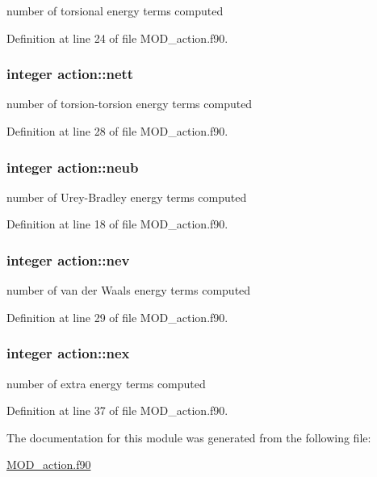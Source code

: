 number of torsional energy terms computed 



Definition at line 24 of file M\-O\-D\-\_\-action.\-f90.

\hypertarget{classaction_a6ea92e5fa1353b0cf4e0220644a28fcf}{
\subsubsection[{nett}]{\setlength{\rightskip}{0pt plus 5cm}integer action\-::nett}}\label{classaction_a6ea92e5fa1353b0cf4e0220644a28fcf}


number of torsion-\/torsion energy terms computed 



Definition at line 28 of file M\-O\-D\-\_\-action.\-f90.

\hypertarget{classaction_a44a0c39774e3630bcb60654dfea00b58}{
\subsubsection[{neub}]{\setlength{\rightskip}{0pt plus 5cm}integer action\-::neub}}\label{classaction_a44a0c39774e3630bcb60654dfea00b58}


number of Urey-\/\-Bradley energy terms computed 



Definition at line 18 of file M\-O\-D\-\_\-action.\-f90.

\hypertarget{classaction_afec6e9aab1f027ea4cb09a04c3503ce4}{
\subsubsection[{nev}]{\setlength{\rightskip}{0pt plus 5cm}integer action\-::nev}}\label{classaction_afec6e9aab1f027ea4cb09a04c3503ce4}


number of van der Waals energy terms computed 



Definition at line 29 of file M\-O\-D\-\_\-action.\-f90.

\hypertarget{classaction_ab44cc1b8e1bff00461e4a7a7595560a3}{
\subsubsection[{nex}]{\setlength{\rightskip}{0pt plus 5cm}integer action\-::nex}}\label{classaction_ab44cc1b8e1bff00461e4a7a7595560a3}


number of extra energy terms computed 



Definition at line 37 of file M\-O\-D\-\_\-action.\-f90.



The documentation for this module was generated from the following file\-:\begin{DoxyCompactItemize}
\item 
\hyperlink{MOD__action_8f90}{M\-O\-D\-\_\-action.\-f90}\end{DoxyCompactItemize}
